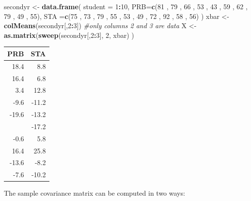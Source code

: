 \documentclass[]{book}
\newenvironment{Shaded}{\begin{snugshade}}{\end{snugshade}}
\newcommand{\CommentTok}[1]{\textcolor[rgb]{0.56,0.35,0.01}{\textit{#1}}}
\newcommand{\DataTypeTok}[1]{\textcolor[rgb]{0.13,0.29,0.53}{#1}}
\newcommand{\DecValTok}[1]{\textcolor[rgb]{0.00,0.00,0.81}{#1}}
\newcommand{\KeywordTok}[1]{\textcolor[rgb]{0.13,0.29,0.53}{\textbf{#1}}}
\newcommand{\NormalTok}[1]{#1}
\newcommand{\OperatorTok}[1]{\textcolor[rgb]{0.81,0.36,0.00}{\textbf{#1}}}
\newcommand{\StringTok}[1]{\textcolor[rgb]{0.31,0.60,0.02}{#1}}
\theoremstyle{definition}
\theoremstyle{definition}
\theoremstyle{definition}
\theoremstyle{remark}
\begin{document}
\begin{Shaded}
\begin{Highlighting}[]
\NormalTok{secondyr <-}\StringTok{ }\KeywordTok{data.frame}\NormalTok{(}
  \DataTypeTok{student =} \DecValTok{1}\OperatorTok{:}\DecValTok{10}\NormalTok{,}
\DataTypeTok{PRB=}\KeywordTok{c}\NormalTok{(}\DecValTok{81}\NormalTok{ , }\DecValTok{79}\NormalTok{ , }\DecValTok{66}\NormalTok{ , }\DecValTok{53}\NormalTok{ , }\DecValTok{43}\NormalTok{ , }\DecValTok{59}\NormalTok{ , }\DecValTok{62}\NormalTok{ , }\DecValTok{79}\NormalTok{ , }\DecValTok{49}\NormalTok{ , }\DecValTok{55}\NormalTok{),}
\DataTypeTok{STA =}\KeywordTok{c}\NormalTok{(}\DecValTok{75}\NormalTok{ , }\DecValTok{73}\NormalTok{ , }\DecValTok{79}\NormalTok{ , }\DecValTok{55}\NormalTok{ , }\DecValTok{53}\NormalTok{ , }\DecValTok{49}\NormalTok{ , }\DecValTok{72}\NormalTok{ , }\DecValTok{92}\NormalTok{ , }\DecValTok{58}\NormalTok{ , }\DecValTok{56}\NormalTok{)}
\NormalTok{        )}
\NormalTok{xbar <-}\StringTok{ }\KeywordTok{colMeans}\NormalTok{(secondyr[,}\DecValTok{2}\OperatorTok{:}\DecValTok{3}\NormalTok{]) }\CommentTok{#only columns 2 and 3 are data}
\NormalTok{X <-}\StringTok{ }\KeywordTok{as.matrix}\NormalTok{(}\KeywordTok{sweep}\NormalTok{(secondyr[,}\DecValTok{2}\OperatorTok{:}\DecValTok{3}\NormalTok{], }\DecValTok{2}\NormalTok{, xbar) ) }
\end{Highlighting}
\end{Shaded}

\begin{table}[H]
\centering
\begin{tabular}{rr}
\toprule
PRB & STA\\
\midrule
18.4 & 8.8\\
16.4 & 6.8\\
3.4 & 12.8\\
-9.6 & -11.2\\
-19.6 & -13.2\\
\addlinespace
-3.6 & -17.2\\
-0.6 & 5.8\\
16.4 & 25.8\\
-13.6 & -8.2\\
-7.6 & -10.2\\
\bottomrule
\end{tabular}
\end{table}

The sample covariance matrix can be computed in two ways:

\begin{Shaded}
\end{Shaded}
\end{document}
